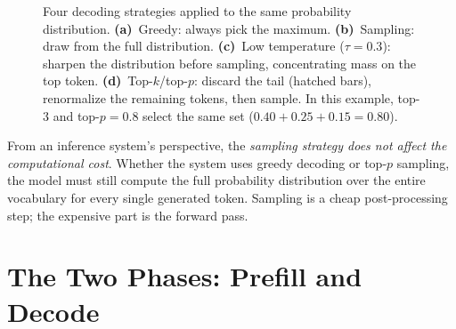 \begin{figure}[ht]
\caption{Four decoding strategies applied to the same probability distribution. \textbf{(a)}~Greedy: always pick the maximum. \textbf{(b)}~Sampling: draw from the full distribution. \textbf{(c)}~Low temperature ($\tau = 0.3$): sharpen the distribution before sampling, concentrating mass on the top token. \textbf{(d)}~Top-$k$/top-$p$: discard the tail (hatched bars), renormalize the remaining tokens, then sample. In this example, top-3 and top-$p = 0.8$ select the same set ($0.40 + 0.25 + 0.15 = 0.80$).}
\label{fig:decoding-strategies}
\end{figure}

\begin{insightbox}
From an inference system's perspective, the \emph{sampling strategy does not affect the computational cost}. Whether the system uses greedy decoding or top-$p$ sampling, the model must still compute the full probability distribution over the entire vocabulary for every single generated token. Sampling is a cheap post-processing step; the expensive part is the forward pass.
\end{insightbox}

\section{The Two Phases: Prefill and Decode}
\label{sec:prefill-decode}

